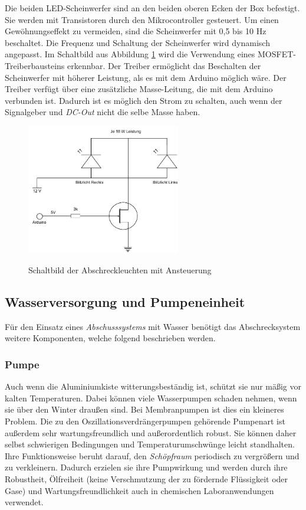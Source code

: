 Die beiden LED-Scheinwerfer sind an den beiden oberen Ecken der Box befestigt. Sie werden mit Transistoren durch den Mikrocontroller gesteuert. Um einen Gewöhnungseffekt zu vermeiden, sind die Scheinwerfer mit 0,5 bis 10 Hz beschaltet. Die Frequenz und Schaltung der Scheinwerfer wird dynamisch angepasst. Im Schaltbild aus Abbildung \ref{diag:lights_diagram} wird die Verwendung eines MOSFET-Treiberbausteins erkennbar. Der Treiber ermöglicht das Beschalten der Scheinwerfer mit höherer Leistung, als es mit dem Arduino möglich wäre. Der Treiber verfügt über eine zusätzliche Masse-Leitung, die mit dem Arduino verbunden ist. Dadurch ist es möglich den Strom zu schalten, auch wenn der Signalgeber und \textit{DC-Out} nicht die selbe Masse haben. \cite{mosfets_am}

\begin{figure}[h]
    \centering
    \includegraphics[width=0.6\textwidth]{images/lights_diagramm.pdf}
    \label{diag:lights_diagram}
    \caption{Schaltbild der Abschreckleuchten mit Ansteuerung}
\end{figure}

\subsection{Wasserversorgung und Pumpeneinheit}

Für den Einsatz eines \textit{Abschusssystems} mit Wasser benötigt das Abschrecksystem weitere Komponenten, welche folgend beschrieben werden.

\subsubsection{Pumpe}

Auch wenn die Aluminiumkiste witterungsbeständig ist, schützt sie nur mäßig vor kalten Temperaturen. Dabei können viele Wasserpumpen schaden nehmen, wenn sie über den Winter draußen sind. Bei Membranpumpen ist dies ein kleineres Problem. Die zu den Oszillationsverdrängerpumpen gehörende Pumpenart ist außerdem sehr wartungsfreundlich und außerordentlich robust. Sie können daher selbst schwierigen Bedingungen und Temperaturumschwünge leicht standhalten.
\\
Ihre Funktionsweise beruht darauf, den \textit{Schöpfraum} periodisch zu vergrößern und zu verkleinern. Dadurch erzielen sie ihre Pumpwirkung und werden durch ihre Robustheit, Ölfreiheit (keine Verschmutzung der zu fördernde Flüssigkeit oder Gase) und Wartungsfreundlichkeit auch in chemischen Laboranwendungen verwendet. \cite{Jousten2018}

